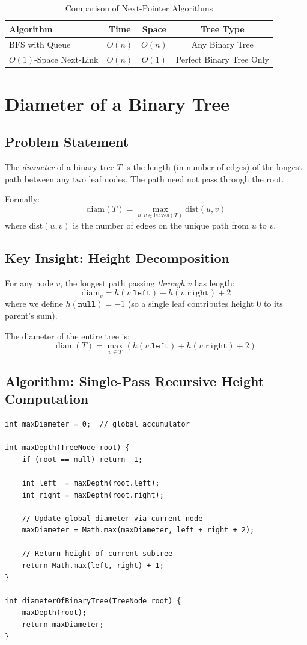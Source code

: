 \documentclass[10pt,journal,compsoc,onecolumn]{IEEEtran}
\begin{document}
\begin{table}[h]
\centering
\caption{Comparison of Next-Pointer Algorithms}
\begin{tabular}{lccc}
\toprule
\textbf{Algorithm} & \textbf{Time} & \textbf{Space} & \textbf{Tree Type} \\
\midrule
BFS with Queue & $O(n)$ & $O(n)$ & Any Binary Tree \\
$O(1)$-Space Next-Link & $O(n)$ & $O(1)$ & Perfect Binary Tree Only \\
\bottomrule
\end{tabular}
\end{table}

\section{Diameter of a Binary Tree}
\label{sec:diameter}

\subsection{Problem Statement}

The \emph{diameter} of a binary tree $T$ is the length (in number of edges) of the longest path between any two leaf nodes. The path need not pass through the root.

Formally:
\[
\text{diam}(T) = \max_{u, v \in \text{leaves}(T)} \text{dist}(u, v)
\]
where $\text{dist}(u, v)$ is the number of edges on the unique path from $u$ to $v$.

\subsection{Key Insight: Height Decomposition}

For any node $v$, the longest path passing \emph{through} $v$ has length:
\[
\text{diam}_v = h(v.\texttt{left}) + h(v.\texttt{right}) + 2
\]
where we define $h(\texttt{null}) = -1$ (so a single leaf contributes height 0 to its parent's sum).

The diameter of the entire tree is:
\[
\text{diam}(T) = \max_{v \in T} \left( h(v.\texttt{left}) + h(v.\texttt{right}) + 2 \right)
\]

\subsection{Algorithm: Single-Pass Recursive Height Computation}

\begin{verbatim}
int maxDiameter = 0;  // global accumulator

int maxDepth(TreeNode root) {
    if (root == null) return -1;

    int left  = maxDepth(root.left);
    int right = maxDepth(root.right);

    // Update global diameter via current node
    maxDiameter = Math.max(maxDiameter, left + right + 2);

    // Return height of current subtree
    return Math.max(left, right) + 1;
}

int diameterOfBinaryTree(TreeNode root) {
    maxDepth(root);
    return maxDiameter;
}
\end{verbatim}
\end{document}
